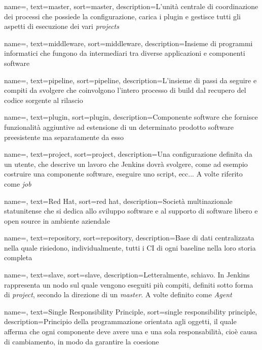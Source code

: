 {
    name=,
    text=master,
    sort=master,
    description={L'unità centrale di coordinazione dei processi che possiede la configurazione, carica i plugin e gestisce tutti gli aspetti di esecuzione dei vari \textit{projects}}
}

{
    name=,
    text=middleware,
    sort=middleware,
    description={Insieme di programmi informatici che fungono da intermediari tra diverse applicazioni e componenti software}
}

{
    name=,
    text=pipeline,
    sort=pipeline,
    description={L'insieme di passi da seguire e compiti da svolgere che coinvolgono l'intero processo di build dal recupero del codice sorgente al rilascio}
}

{
    name=,
    text=plugin,
    sort=plugin,
    description={Componente software che fornisce funzionalità aggiuntive ad estensione di un determinato prodotto software preesistente ma separatamente da esso}
}

{
    name=,
    text=project,
    sort=project,
    description={Una configurazione definita da un utente, che descrive un lavoro che Jenkins dovrà svolgere, come ad esempio costruire una componente software, eseguire uno script, ecc... A volte riferito come \textit{job}}
}

{
    name=,
    text=Red Hat,
    sort=red hat,
    description={Società multinazionale statunitense che si dedica allo sviluppo software e al supporto di software libero e open source in ambiente aziendale}
}

{
    name=,
    text=repository,
    sort=repository,
    description={Base di dati centralizzata nella quale risiedono, individualmente, tutti i \gls{CI} di ogni \gls{baseline} nella loro storia completa}
}

{
    name=,
    text=slave,
    sort=slave,
    description={Letteralmente, schiavo. In Jenkins rappresenta un nodo sul quale vengono eseguiti più compiti, definiti sotto forma di \textit{project}, secondo la direzione di un \textit{master}. A volte definito come \textit{Agent}}
}

{
    name=,
    text=Single Responsibility Principle,
    sort=single responsibility principle,
    description={Principio della programmazione orientata agli oggetti, il quale afferma che ogni componente deve avere una e una sola responsabilità, cioè causa di cambiamento, in modo da garantire la coesione}
}

